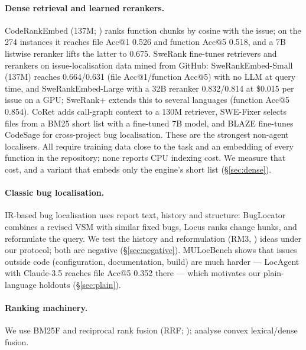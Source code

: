 \documentclass[10pt,twocolumn]{article}
\makeatletter
\newcommand{\accat}[1]{Acc@#1}
\makeatother
\begin{document}
\paragraph{Dense retrieval and learned rerankers.}
CodeRankEmbed (137M; \citealp{suresh2025cornstack}) ranks function chunks by cosine with the issue;
on the 274 instances it reaches file \accat{1} 0.526 and function \accat{5} 0.518, and a 7B
listwise reranker lifts the latter to 0.675. SweRank \citep{reddy2026swerank} fine-tunes retrievers
and rerankers on issue-localisation data mined from GitHub: SweRankEmbed-Small (137M) reaches
0.664/0.631 (file \accat{1}/function \accat{5}) with no LLM at query time, and
SweRankEmbed-Large with a 32B reranker 0.832/0.814 at \$0.015 per issue on a GPU; SweRank+
\citep{reddy2025swerankplus} extends this to several languages (function \accat{5} 0.854). CoRet
\citep{fehr2025coret} adds call-graph context to a 130M retriever, SWE-Fixer \citep{xie2025swefixer}
selects files from a BM25 short list with a fine-tuned 7B model, and BLAZE
\citep{chakraborty2025blaze} fine-tunes CodeSage \citep{zhang2024codesage} for cross-project bug
localisation. These are the strongest non-agent localisers. All require training data close to the
task and an embedding of every function in the repository; none reports CPU indexing cost. We
measure that cost, and a variant that embeds only the engine's short list (\S\ref{sec:dense}).

\paragraph{Classic bug localisation.}
IR-based bug localisation uses report text, history and structure: BugLocator
\citep{zhou2012buglocator} combines a revised VSM with similar fixed bugs, Locus
\citep{wen2016locus} ranks change hunks, and \citet{rahman2018query} reformulate the query. We test
the history and reformulation (RM3, \citealp{abduljaleel2004rm3}) ideas under our protocol; both are
negative (\S\ref{sec:negative}). MULocBench \citep{zhang2025mulocbench} shows that issues outside
code (configuration, documentation, build) are much harder --- LocAgent with Claude-3.5 reaches file
\accat{5} 0.352 there --- which motivates our plain-language holdouts (\S\ref{sec:plain}).

\paragraph{Ranking machinery.}
We use BM25F \citep{robertson2004bm25f} and reciprocal rank fusion (RRF;
\citealp{cormack2009rrf}); \citet{bruch2023fusion} analyse convex lexical/dense fusion.
\end{document}

